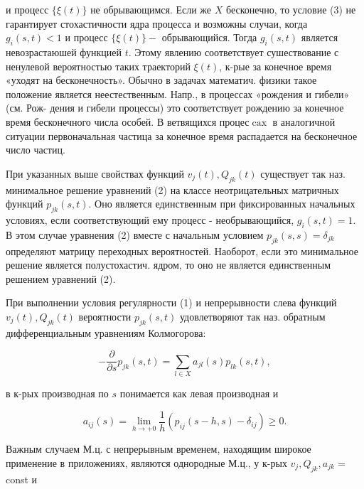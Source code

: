 \documentclass[10pt]{article}
\begin{document}
и процесс $\{\xi(t)\}$ не обрывающимся. Если же $X$ бесконечно, то условие (3) не гарантирует стохастичности ядра процесса и возможны случаи, когда $g_{i}(s, t)<1$ и процесс $\{\xi(t)\}-$ обрывающийся. Тогда $g_{i}(s, t)$ является невозрастаюшей функцией $t$. Этому явлению соответствует сушествование с ненулевой вероятностью таких траекторий $\xi(t)$, к-рые за конечное время «уходят на бесконечность». Обычно в задачах математич. физики такое положение является неестественным. Напр., в процессах «рождения и гибели» (см. Рож- дения и гибели процессы) это соответствует рождению за конечное время бесконечного числа особей. В ветвящихся процес$\operatorname{cax}$ в аналогичной ситуации первоначальная частица за конечное время распадается на бесконечное число частиц.



При указанных выше свойствах функций $v_{j}(t), Q_{j k}(t)$ существует так наз. минимальное решение уравнений (2) на классе неотрицательных матричных функций $p_{j k}(s, t)$. Оно является единственным при фиксированных начальных условиях, если соответствующий ему процесс - необрывающийся, $g_{i}(s, t)=1$. В этом случае уравнения (2) вместе с начальным условием $p_{j k}(s, s)=\delta_{j k}$ определяют матрицу переходных вероятностей. Наоборот, если это минимальное решение является полустохастич. ядром, то оно не является единственным решением уравнений (2).



При выполнении условия регулярности (1) и непрерывности слева функций $v_{j}(t), Q_{j k}(t)$ вероятности $p_{j k}(s, t)$ удовлетворяют так наз. обратным дифференциальным уравнениям Колмогорова:



\[

-\frac{\partial}{\partial s} p_{j k}(s, t)=\sum_{l \in X} a_{j l}(s) p_{l k}(s, t),

\]



в к-рых производная по $s$ понимается как левая производная и



\[

a_{i j}(s)=\lim _{h \rightarrow+0} \frac{1}{h}\left(p_{i j}(s-h, s)-\delta_{i j}\right) \geqslant 0 .

\]



Важным случаем М.ц. с непрерывным временем, находящим широкое применение в приложениях, являются однородные М.ц., у к-рых $v_{j}, Q_{j k}, a_{j k}=$ const и
\end{document}
